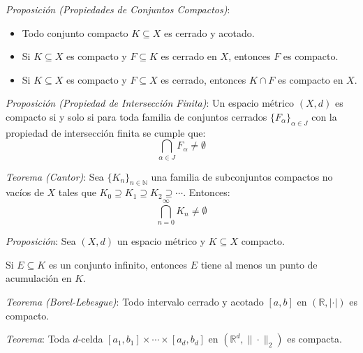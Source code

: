 \documentclass{beamer}
\begin{document}
  \begin{frame}
    \textit{Proposición (Propiedades de Conjuntos Compactos)}:
    \newline

    \begin{itemize}[<+->]
      \item Todo conjunto compacto $K \subseteq X$ es cerrado y acotado.
      \item Si $K \subseteq X$ es compacto y $F \subseteq K$ es cerrado en $X$, entonces $F$ es compacto.
      \item Si $K \subseteq X$ es compacto y $F \subseteq X$ es cerrado, entonces $K \cap F$ es compacto en $X$.
    \end{itemize}
  \end{frame}

  \begin{frame}
    \textit{Proposición (Propiedad de Intersección Finita)}: Un espacio métrico $(X, d)$ es compacto si y solo si para toda familia de conjuntos cerrados $\{F_\alpha\}_{\alpha \in J}$ con la propiedad de intersección finita se cumple que:
    \[ \bigcap_{\alpha \in J} F_\alpha \neq \emptyset \]

    \pause
    \vspace{0.5em}
    \textit{Teorema (Cantor)}: Sea $\{K_n\}_{n \in \mathbb{N}}$ una familia de subconjuntos compactos no vacíos de $X$ tales que $K_0 \supseteq K_1 \supseteq K_2 \supseteq \cdots$. Entonces:
    \[ \bigcap_{n=0}^\infty K_n \neq \emptyset \]
  \end{frame}

  \begin{frame}
    \textit{Proposición}: Sea $(X, d)$ un espacio métrico y $K \subseteq X$ compacto.
    \newline\newline

    Si $E \subseteq K$ es un conjunto infinito, entonces $E$ tiene al menos un punto de acumulación en $K$.
  \end{frame}

  \begin{frame}
    \textit{Teorema (Borel-Lebesgue)}: Todo intervalo cerrado y acotado $[a, b]$ en $(\mathbb{R}, |\cdot|)$ es compacto.
    \newline\newline

    \pause
    \textit{Teorema}: Toda $d$-celda $[a_1, b_1] \times \cdots \times [a_d, b_d]$ en $(\mathbb{R}^d, \|\cdot\|_2)$ es compacta.
  \end{frame}
\end{document}
